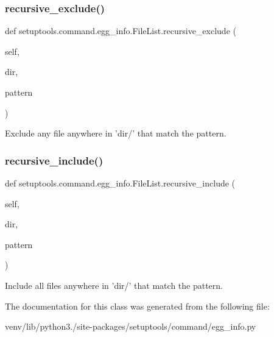 \subsubsection{\texorpdfstring{recursive\+\_\+exclude()}{recursive\_exclude()}}
{\footnotesize\ttfamily def setuptools.\+command.\+egg\+\_\+info.\+File\+List.\+recursive\+\_\+exclude (\begin{DoxyParamCaption}\item[{}]{self,  }\item[{}]{dir,  }\item[{}]{pattern }\end{DoxyParamCaption})}

\begin{DoxyVerb}Exclude any file anywhere in 'dir/' that match the pattern.
\end{DoxyVerb}
 \mbox{\label{classsetuptools_1_1command_1_1egg__info_1_1_file_list_a287e9bf1901bbc7fe07e6018227e8493}} 
\subsubsection{\texorpdfstring{recursive\+\_\+include()}{recursive\_include()}}
{\footnotesize\ttfamily def setuptools.\+command.\+egg\+\_\+info.\+File\+List.\+recursive\+\_\+include (\begin{DoxyParamCaption}\item[{}]{self,  }\item[{}]{dir,  }\item[{}]{pattern }\end{DoxyParamCaption})}

\begin{DoxyVerb}Include all files anywhere in 'dir/' that match the pattern.
\end{DoxyVerb}
 

The documentation for this class was generated from the following file\+:\begin{DoxyCompactItemize}
\item 
venv/lib/python3./site-\/packages/setuptools/command/egg\+\_\+info.\+py\end{DoxyCompactItemize}
